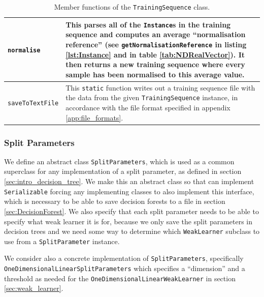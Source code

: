 \documentclass[12pt,twoside,notitlepage]{report}
\begin{document}
\begin{table}[H]
\begin{tabularx}{\textwidth}{p{4.5cm}|X}
                        \texttt{normalise} & 
                            This parses all of the \texttt{Instance}s in the training sequence and computes an average 
                            ``normalisation reference'' (see \texttt{getNormalisationReference} in listing 
                            \ref{lst:Instance} and in table \ref{tab:NDRealVector}). It then returns a new training 
                            sequence where every sample has been normalised to this average value. \\
                        \hline

                        \texttt{saveToTextFile} & 
                            This \texttt{static} function writes out a training sequence file with the data from the 
                            given \texttt{TrainingSequence} instance, in accordance with the file format specified in 
                            appendix \ref{app:file_formats}. \\

                    \end{tabularx}
                    \caption{Member functions of the \texttt{TrainingSequence} class.}
                    \label{tab:TrainingSequence}
                \end{table}





            \subsubsection{Split Parameters} \label{sec:split_params}
                We define an abstract class \texttt{SplitParameters}, which is used as a common superclass for any 
                implementation of a split parameter, as defined in section \ref{sec:intro_decision_tree}. We 
                make this an abstract class so that can implement \texttt{Serializable} forcing
                any implementing classes to also implement this interface, which is 
                necessary to be able to save decision forests to a file in section \ref{sec:DecisionForest}. 
                We also specify that each split parameter needs to be 
                able to specify what weak learner it is for, because we only save the split parameters in 
                decision trees and we need some way to determine which \texttt{WeakLearner} subclass to use from a 
                \texttt{SplitParameter} instance. 

                We consider also a concrete implementation of \texttt{SplitParameters}, specifically 
                \texttt{OneDimensionalLinearSplitParameters} which specifies a ``dimension'' and a threshold as needed 
                for the \texttt{OneDimensionalLinearWeakLearner} in section \ref{sec:weak_learner}. 
\end{document}
